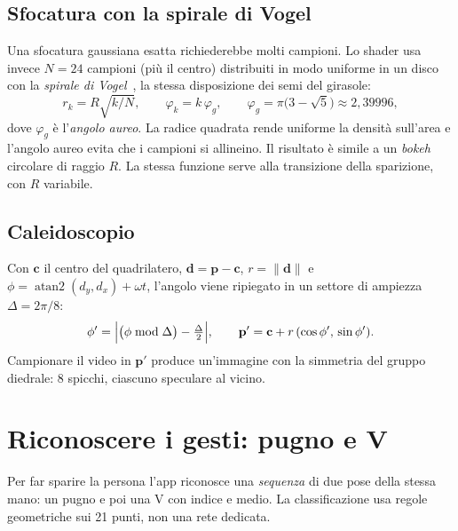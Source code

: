 \documentclass[11pt,a4paper]{article}
\newcommand{\vect}[1]{\mathbf{#1}}
\begin{document}
\subsection{Sfocatura con la spirale di Vogel}
\label{sec:blur}
Una sfocatura gaussiana esatta richiederebbe molti campioni. Lo shader usa invece $N=24$ campioni
(più il centro) distribuiti in modo uniforme in un disco con la \emph{spirale di
Vogel}~\cite{vogel1979}, la stessa disposizione dei semi del girasole:
\begin{equation}
  r_k=R\sqrt{k/N},\qquad \varphi_k=k\,\varphi_g,\qquad \varphi_g=\pi\bigl(3-\sqrt5\bigr)\approx2{,}39996,
\end{equation}
dove $\varphi_g$ è l'\emph{angolo aureo}. La radice quadrata rende uniforme la densità sull'area e
l'angolo aureo evita che i campioni si allineino. Il risultato è simile a un \emph{bokeh} circolare
di raggio $R$. La stessa funzione serve alla transizione della sparizione, con $R$ variabile.

\subsection{Caleidoscopio}
Con $\vect{c}$ il centro del quadrilatero, $\vect{d}=\vect{p}-\vect{c}$, $r=\|\vect{d}\|$ e
$\phi=\operatorname{atan2}(d_y,d_x)+\omega t$, l'angolo viene ripiegato in un settore di ampiezza
$\Delta=2\pi/8$:
\begin{equation}
  \phi'=\Bigl|\bigl(\phi\bmod\Delta\bigr)-\tfrac{\Delta}{2}\Bigr|,\qquad
  \vect{p}'=\vect{c}+r\,(\cos\phi',\,\sin\phi').
\end{equation}
Campionare il video in $\vect{p}'$ produce un'immagine con la simmetria del gruppo diedrale: 8
spicchi, ciascuno speculare al vicino.

\section{Riconoscere i gesti: pugno e V}
\label{sec:gesti}

Per far sparire la persona l'app riconosce una \emph{sequenza} di due pose della stessa mano: un
pugno e poi una V con indice e medio. La classificazione usa regole geometriche sui 21 punti, non
una rete dedicata.
\end{document}

